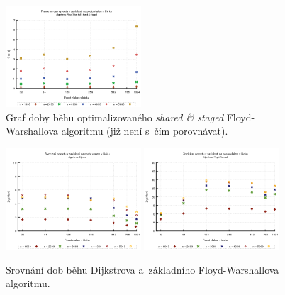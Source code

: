 \begin{figure}
    \centering
    \includegraphics[width=0.45\textwidth]{../grafy/03_cuda/03-01-Floyd_v2_cas_zoom}
    \caption{Graf doby běhu optimalizovaného \emph{shared \& staged} Floyd-Warshallova algoritmu (již není s~čím porovnávat).}
    \label{f:mer:cuda:cas3}
\end{figure}

\begin{figure}
    \centering
    \includegraphics[width=0.45\textwidth]{../grafy/03_cuda/03-02-Dijkstra_zrychleni}
    \includegraphics[width=0.45\textwidth]{../grafy/03_cuda/03-02-Floyd_v1_zrychleni}
    \caption{Srovnání dob běhu Dijkstrova a~základního Floyd-Warshallova algoritmu.}
    \label{f:mer:cuda:zrychleni1}
\end{figure}

